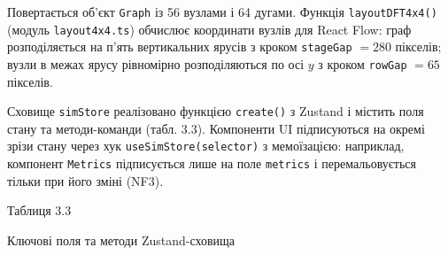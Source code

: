 \documentclass[
]{article}
\newcommand{\passthrough}[1]{#1}
\begin{document}
Повертається об'єкт \passthrough{\lstinline!Graph!} із 56 вузлами і 64
дугами. Функція
\passthrough{\lstinline!layoutDFT!}\passthrough{\lstinline!4!}\passthrough{\lstinline!x!}\passthrough{\lstinline!4()!}
(модуль
\passthrough{\lstinline!layout!}\passthrough{\lstinline!4!}\passthrough{\lstinline!x!}\passthrough{\lstinline!4.!}\passthrough{\lstinline!ts!})
обчислює координати вузлів для React Flow: граф розподіляється на п'ять
вертикальних ярусів з кроком \passthrough{\lstinline!stageGap!}
\(= 280\) пікселів; вузли в межах ярусу рівномірно розподіляються по осі
\(y\) з кроком \passthrough{\lstinline!rowGap!} \(= 65\) пікселів.

Сховище \passthrough{\lstinline!simStore!} реалізовано функцією
\passthrough{\lstinline!create!}\passthrough{\lstinline!()!} з Zustand і
містить поля стану та методи-команди (табл. 3.3). Компоненти UI
підписуються на окремі зрізи стану через хук
\passthrough{\lstinline!useSimStore!}\passthrough{\lstinline!(!}\passthrough{\lstinline!selector!}\passthrough{\lstinline!)!}
з мемоїзацією: наприклад, компонент \passthrough{\lstinline!Metrics!}
підписується лише на поле \passthrough{\lstinline!metrics!} і
перемальовується тільки при його зміні (NF3).

Таблиця 3.3

Ключові поля та методи Zustand-сховища
\end{document}
